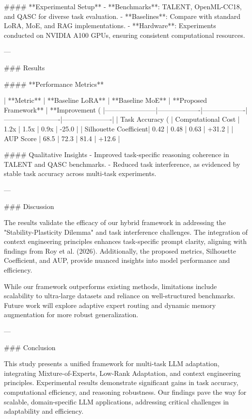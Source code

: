 #### **Experimental Setup**  
- **Benchmarks**: TALENT, OpenML-CC18, and QASC for diverse task evaluation.  
- **Baselines**: Compare with standard LoRA, MoE, and RAG implementations.  
- **Hardware**: Experiments conducted on NVIDIA A100 GPUs, ensuring consistent computational resources.  

---

### Results  

#### **Performance Metrics**  

| **Metric**           | **Baseline LoRA** | **Baseline MoE** | **Proposed Framework** | **Improvement (%
|-----------------------|-------------------|-------------------|-------------------------|----------------------|
| Task Accuracy (%
| Computational Cost    | 1.2x             | 1.5x             | 0.9x                   | -25.0               |
| Silhouette Coefficient| 0.42             | 0.48             | 0.63                   | +31.2               |
| AUP Score            | 68.5             | 72.3             | 81.4                   | +12.6               |

#### Qualitative Insights  
- Improved task-specific reasoning coherence in TALENT and QASC benchmarks.  
- Reduced task interference, as evidenced by stable task accuracy across multi-task experiments.  

---

### Discussion  

The results validate the efficacy of our hybrid framework in addressing the "Stability-Plasticity Dilemma" and task interference challenges. The integration of context engineering principles enhances task-specific prompt clarity, aligning with findings from Roy et al. (2026). Additionally, the proposed metrics, Silhouette Coefficient, and AUP, provide nuanced insights into model performance and efficiency.  

While our framework outperforms existing methods, limitations include scalability to ultra-large datasets and reliance on well-structured benchmarks. Future work will explore adaptive expert routing and dynamic memory augmentation for more robust generalization.  

---

### Conclusion  

This study presents a unified framework for multi-task LLM adaptation, integrating Mixture-of-Experts, Low-Rank Adaptation, and context engineering principles. Experimental results demonstrate significant gains in task accuracy, computational efficiency, and reasoning robustness. Our findings pave the way for scalable, domain-specific LLM applications, addressing critical challenges in adaptability and efficiency.  

